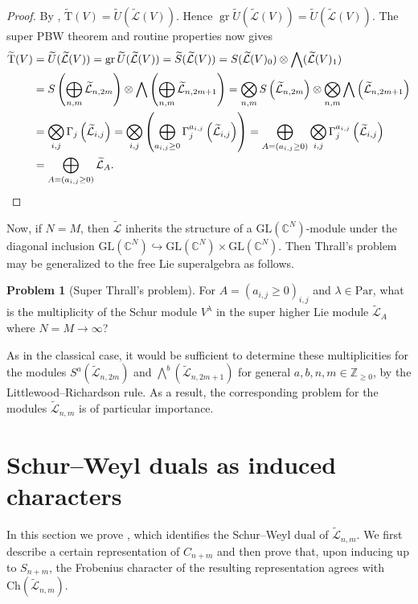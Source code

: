 \documentclass[11pt]{article}
\theoremstyle{definition}
\newtheorem{prob}[theo]{Problem}
\numberwithin{equation}{section}
\DeclareMathOperator{\gr}{gr}
\newcommand\CC{\mathbb{C}}
\newcommand\ZZ{\mathbb{Z}}
\newcommand\GL{\mathrm{GL}}
\newcommand\Trm{\mathrm{T}}
\newcommand\Ltil{\widetilde{\mathcal{L}}}
\newcommand\Stil{\widetilde{S}}
\newcommand\Util{\widetilde{U}}
\newcommand\Trmtil{\widetilde{\Trm}}
\newcommand\Ch{\mathrm{Ch}}
\begin{document}
\begin{proof}
    By , $\Trmtil(V) = \Util(\Ltil(V))$. Hence $\gr \Util(\Ltil(V)) = \Util(\Ltil(V))$. The super PBW theorem and routine properties now gives
    \begin{align*}
        \Trmtil(V)
          &= \Util(\Ltil(V)) = \gr \Util(\Ltil(V)) = \Stil(\Ltil(V)) = S(\Ltil(V)_0) \otimes \bigwedge(\Ltil(V)_1) \\
          &= S\left(\bigoplus_{n,m} \Ltil_{n, 2m}\right) \otimes \bigwedge\left(\bigoplus_{n,m} \Ltil_{n, 2m+1}\right)
           = \bigotimes_{n,m} S\left(\Ltil_{n, 2m}\right) \otimes \bigotimes_{n, m} \bigwedge\left(\Ltil_{n, 2m+1}\right) \\
          &= \bigotimes_{i, j} \Gamma_j\left(\Ltil_{i, j}\right)
           = \bigotimes_{i, j} \left( \bigoplus_{a_{i, j} \geq 0} \Gamma_j^{a_{i, j}}\left(\Ltil_{i, j}\right) \right)
           = \bigoplus_{A = (a_{i, j} \geq 0)} \bigotimes_{i, j} \Gamma_j^{a_{i, j}}\left(\Ltil_{i, j}\right) \\
          &= \bigoplus_{A = (a_{i, j} \geq 0)} \Ltil_A.\qedhere
    \end{align*}
\end{proof}

Now, if $N = M$, then $\Ltil$ inherits the structure of a $\GL(\CC^N)$-module under the diagonal inclusion $\GL(\CC^N) \hookrightarrow \GL(\CC^N) \times \GL(\CC^N)$. Then Thrall's problem may be generalized to the free Lie superalgebra as follows.
\begin{prob}[Super Thrall's problem]
  For $A = (a_{i, j} \geq 0)_{i, j}$ and $\lambda \in \mathrm{Par}$, what is the multiplicity of the Schur module $V^\lambda$ in the super higher Lie module $\Ltil_A$ where $N=M \to \infty$?
\end{prob}
As in the classical case, it would be sufficient to determine these multiplicities for the modules $S^a(\Ltil_{n,2m})$ and $\bigwedge^b(\Ltil_{n,2m+1})$ for general $a,b,n,m \in \ZZ_{\ge 0}$, by the Littlewood--Richardson rule. As a result, the corresponding problem for the modules $\Ltil_{n,m}$ is of particular importance.

\section{Schur--Weyl duals as induced characters}\label{sec:super-induced}
In this section we prove , which identifies the Schur--Weyl dual of $\Ltil_{n,m}$. We first describe a certain representation of $C_{n+m}$ and then prove that, upon inducing up to $S_{n+m}$, the Frobenius character of the resulting representation agrees with $\Ch(\Ltil_{n,m})$.
\end{document}
